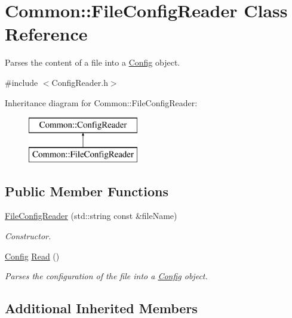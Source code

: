 \hypertarget{class_common_1_1_file_config_reader}{\section{Common\-:\-:File\-Config\-Reader Class Reference}
\label{class_common_1_1_file_config_reader}
}


Parses the content of a file into a \hyperlink{class_common_1_1_config}{Config} object.  




{\ttfamily \#include $<$Config\-Reader.\-h$>$}

Inheritance diagram for Common\-:\-:File\-Config\-Reader\-:\begin{figure}[H]
\begin{center}
\leavevmode
\includegraphics[height=2.000000cm]{class_common_1_1_file_config_reader}
\end{center}
\end{figure}
\subsection*{Public Member Functions}
\begin{DoxyCompactItemize}
\item 
\hyperlink{class_common_1_1_file_config_reader_adfdd8100b30811cf8a1800e48fe6e037}{File\-Config\-Reader} (std\-::string const \&file\-Name)
\begin{DoxyCompactList}\small\item\em Constructor. \end{DoxyCompactList}\item 
\hyperlink{class_common_1_1_config}{Config} \hyperlink{class_common_1_1_file_config_reader_a8ef84330b129aa44ad36c6de827d4cad}{Read} ()
\begin{DoxyCompactList}\small\item\em Parses the configuration of the file into a \hyperlink{class_common_1_1_config}{Config} object. \end{DoxyCompactList}\end{DoxyCompactItemize}
\subsection*{Additional Inherited Members}


